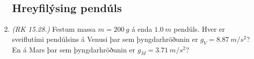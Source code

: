 \ifdefined \wholebook \else\documentclass[oneside]{book}\usepackage{EdlBook}\graphicspath{{figures/}}
\begin{document}
\begin{enumerate}[label = \textbf{Dæmi \thechapter.\arabic*.}]

\newpage

\subsection*{Hreyfilýsing pendúls}

\item \textit{(RK 15.28.)} Festum massa $m = \SI{200}{g}$ á enda $\SI{1.0}{m}$ pendúls. Hver er sveiflutími pendúlsins á Venusi þar sem þyngdarhröðunin er $g_V = \SI{8.87}{m/s^2}$? En á Mars þar sem þyngdarhröðunin er $g_M = \SI{3.71}{m/s^2}$?


\end{enumerate}
\end{document}
